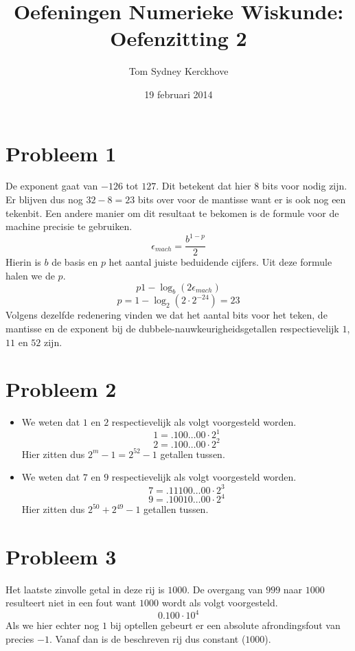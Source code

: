\documentclass[12pt,a4paper]{article}
\author{Tom Sydney Kerckhove}
\title{Oefeningen Numerieke Wiskunde:\\ Oefenzitting 2}
\date{19 februari 2014}
\begin{document}
\maketitle

\section{Probleem 1}
De exponent gaat van $-126$ tot $127$. Dit betekent dat hier $8$ bits voor nodig zijn. Er blijven dus nog $32-8 = 23$ bits over voor de mantisse want er is ook nog een tekenbit.
Een andere manier om dit resultaat te bekomen is de formule voor de machine precisie te gebruiken.
\[
\epsilon_{mach} = \frac{b^{1-p}}{2}
\]
Hierin is $b$ de basis en $p$ het aantal juiste beduidende cijfers.
Uit deze formule halen we de $p$.
\[
p 1-\log_{b}(2\epsilon_{mach})
\]
\[
p = 1-\log_{2}(2\cdot 2^{-24}) = 23
\]
Volgens dezelfde redenering vinden we dat het aantal bits voor het teken, de mantisse en de exponent bij de dubbele-nauwkeurigheidsgetallen respectievelijk $1$, $11$ en $52$ zijn.

\section{Probleem 2}
\begin{itemize}
\item We weten dat $1$ en $2$ respectievelijk als volgt voorgesteld worden.
\[1 = .100\ldots00 \cdot 2^1\]
\[2 = .100\ldots00 \cdot 2^2\]
Hier zitten dus $2^m-1=2^{52}-1$ getallen tussen.
\item We weten dat $7$ en $9$ respectievelijk als volgt voorgesteld worden.
\[7 = .11100\ldots00 \cdot 2^3\]
\[9 = .10010\ldots00 \cdot 2^4\]
Hier zitten dus $2^{50}+2^{49}-1$ getallen tussen.
\end{itemize}

\section{Probleem 3}
Het laatste zinvolle getal in deze rij is $1000$. De overgang van $999$ naar $1000$ resulteert niet in een fout want $1000$ wordt als volgt voorgesteld.
\[0.100 \cdot 10^4\]
Als we hier echter nog $1$ bij optellen gebeurt er een absolute afrondingsfout van precies $-1$. Vanaf dan is de beschreven rij dus constant ($1000$).
\end{document}
